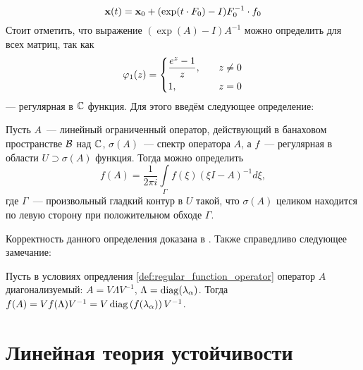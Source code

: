 \begin{equation}
    \label{eq:linearized_solution}
    \mathbf{x}(t) = \mathbf{x}_0 + (\exp(t \cdot F_0) - I) F_0^{-1} \cdot f_0
\end{equation}
Стоит отметить, что выражение $ (\exp(A) - I) A^{-1} $ можно определить для всех матриц, так как
\begin{equation}
    \label{eq:phi_1_function}
    \varphi_1(z) =
    \begin{dcases}
        \frac{e^z - 1}{z}, &\quad z \neq 0 \\
        1, &\quad z = 0
    \end{dcases}
\end{equation}
--- регулярная в $ \mathbb{C} $ функция.
Для этого введём следующее определение:

\begin{definition}
    \label{def:regular_function_operator}
    Пусть $ A $~--- линейный ограниченный оператор, действующий в банаховом пространстве $ \mathcal{B} $ над $ \mathbb{C} $,
    $ \sigma(A) $~--- спектр оператора $ A $, а
    $ f $~--- регулярная в области $ U \supset \sigma(A) $ функция.
    Тогда можно определить
    \begin{equation}
        \label{eq:regular_function_operator}
        f(A) = \frac{1}{2 \pi i} \int\limits_{\Gamma} f(\xi) \left( \xi I - A \right)^{-1} d \xi,
    \end{equation}
    где $ \Gamma $~--- произвольный гладкий контур в $ U $ такой,
    что $ \sigma(A) $ целиком находится по левую сторону при положительном обходе $ \Gamma $.
\end{definition}

Корректность данного определения доказана в \cite{takesaki2001opalgebras1}.
Также справедливо следующее замечание:

\begin{remark}
    \label{rem:regular_function_diagonalizable_operator}
    Пусть в условиях опредления \ref{def:regular_function_operator} оператор $ A $ диагонализуемый: $ A = V \Lambda V^{-1} $, $ \Lambda = \operatorname{diag}(\lambda_{\alpha}) $.
    Тогда $ f(A) = V f(\Lambda) V^{-1} = V \operatorname{diag} \left(f(\lambda_{\alpha}) \right) V^{-1} $.
\end{remark}



\section{Линейная теория устойчивости}
\label{sec:linear_stability}

